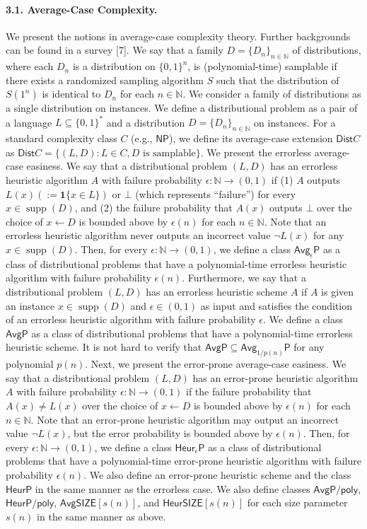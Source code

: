 \paragraph{3.1. Average-Case Complexity.}
We present the notions in average-case complexity theory. Further backgrounds can be found in a survey [7].
We say that a family $D=\{D_n\}_{n\in\mathbb N}$ of distributions, where each $D_n$ is a distribution on $\{0,1\}^n$, is (polynomial-time) samplable if there exists a randomized sampling algorithm $S$ such that the distribution of $S(1^n)$ is identical to $D_n$ for each $n\in\mathbb N$. We consider a family of distributions as a single distribution on instances. We define a distributional problem as a pair of a language $L\subseteq\{0,1\}^*$ and a distribution $D=\{D_n\}_{n\in\mathbb N}$ on instances. For a standard complexity class $C$ (e.g., $\mathsf{NP}$), we define its average-case extension $\mathsf{Dist}C$ as $\mathsf{Dist}C=\{(L,D):L\in C,D\text{ is samplable}\}$.
We present the errorless average-case easiness. We say that a distributional problem $(L,D)$ has an errorless heuristic algorithm $A$ with failure probability $\epsilon:\mathbb N\to(0,1)$ if (1) $A$ outputs $L(x)(:=\mathbf1\{x\in L\})$ or $\bot$ (which represents ``failure'') for every $x\in\operatorname{supp}(D)$, and (2) the failure probability that $A(x)$ outputs $\bot$ over the choice of $x\leftarrow D$ is bounded above by $\epsilon(n)$ for each $n\in\mathbb N$. Note that an errorless heuristic algorithm never outputs an incorrect value $\neg L(x)$ for any $x\in\operatorname{supp}(D)$. Then, for every $\epsilon:\mathbb N\to(0,1)$, we define a class $\mathsf{Avg}_\epsilon\mathsf P$ as a class of distributional problems that have a polynomial-time errorless heuristic algorithm with failure probability $\epsilon(n)$. Furthermore, we say that a distributional problem $(L,D)$ has an errorless heuristic scheme $A$ if $A$ is given an instance $x\in\operatorname{supp}(D)$ and $\epsilon\in(0,1)$ as input and satisfies the condition of an errorless heuristic algorithm with failure probability $\epsilon$. We define a class $\mathsf{AvgP}$ as a class of distributional problems that have a polynomial-time errorless heuristic scheme. It is not hard to verify that $\mathsf{AvgP}\subseteq\mathsf{Avg}_{1/p(n)}\mathsf P$ for any polynomial $p(n)$.
Next, we present the error-prone average-case easiness. We say that a distributional problem $(L,D)$ has an error-prone heuristic algorithm $A$ with failure probability $\epsilon:\mathbb N\to(0,1)$ if the failure probability that $A(x)\neq L(x)$ over the choice of $x\leftarrow D$ is bounded above by $\epsilon(n)$ for each $n\in\mathbb N$. Note that an error-prone heuristic algorithm may output an incorrect value $\neg L(x)$, but the error probability is bounded above by $\epsilon(n)$. Then, for every $\epsilon:\mathbb N\to(0,1)$, we define a class $\mathsf{Heur}_\epsilon\mathsf P$ as a class of distributional problems that have a polynomial-time error-prone heuristic algorithm with failure probability $\epsilon(n)$. We also define an error-prone heuristic scheme and the class $\mathsf{HeurP}$ in the same manner as the errorless case.
We also define classes $\mathsf{AvgP/poly}$, $\mathsf{HeurP/poly}$, $\mathsf{AvgSIZE}[s(n)]$, and $\mathsf{HeurSIZE}[s(n)]$ for each size parameter $s(n)$ in the same manner as above.
